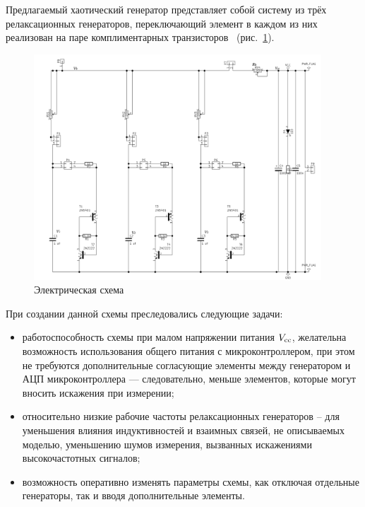 Предлагаемый хаотический генератор представляет собой
систему из трёх релаксационных генераторов,
переключающий элемент в каждом из них реализован
на паре комплиментарных транзисторов~\cite{atu_st107}
(рис.~\ref{atu:f:relax3d_schem}).

\begin{figure}[htb!]
  \centerline{\includegraphics[width=0.96\textwidth]{p/relax3d_schem.png} }
  \caption{Электрическая схема \RelaxBjtIi}
  \label{atu:f:relax3d_schem}
\end{figure}

При создании данной схемы преследовались следующие задачи:
\begin{itemize}

  \item
    работоспособность схемы при малом напряжении питания $V_\mathrm{cc}$,
    желательна возможность использования общего питания с микроконтроллером,
    при этом не требуются дополнительные согласующие элементы
    между генератором и АЦП микроконтроллера --- следовательно,
    меньше элементов, которые могут вносить искажения при измерении;

  \item
    относительно низкие рабочие частоты релаксационных генераторов --
    для уменьшения влияния индуктивностей и взаимных связей, не описываемых моделью,
    уменьшению шумов измерения, вызванных искажениями высокочастотных сигналов;

  \item
    возможность оперативно изменять параметры схемы, как отключая отдельные генераторы,
    так и вводя дополнительные элементы.

\end{itemize}

